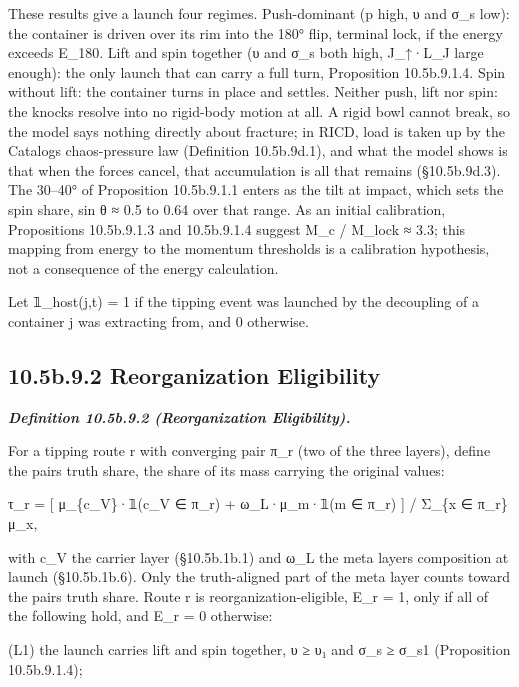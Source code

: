 \documentclass[
]{article}
\begin{document}
These results give a launch four regimes. Push-dominant (p high, υ and
σ\_s low): the container is driven over its rim into the 180° flip,
terminal lock, if the energy exceeds E\_180. Lift and spin together (υ
and σ\_s both high, J\_↑·L\_J large enough): the only launch that can
carry a full turn, Proposition 10.5b.9.1.4. Spin without lift: the
container turns in place and settles. Neither push, lift nor spin: the
knocks resolve into no rigid-body motion at all. A rigid bowl cannot
break, so the model says nothing directly about fracture; in RICD, load
is taken up by the Catalog\textquotesingle s chaos-pressure law
(Definition 10.5b.9d.1), and what the model shows is that when the
forces cancel, that accumulation is all that remains (§10.5b.9d.3). The
30--40° of Proposition 10.5b.9.1.1 enters as the tilt at impact, which
sets the spin share, sin θ ≈ 0.5 to 0.64 over that range. As an initial
calibration, Propositions 10.5b.9.1.3 and 10.5b.9.1.4 suggest M\_c /
M\_lock ≈ 3.3; this mapping from energy to the momentum thresholds is a
calibration hypothesis, not a consequence of the energy calculation.

Let 𝟙\_host(j,t) = 1 if the tipping event was launched by the decoupling
of a container j was extracting from, and 0 otherwise.

\hypertarget{b.9.2-reorganization-eligibility}{%
\subsection{10.5b.9.2 Reorganization
Eligibility}\label{b.9.2-reorganization-eligibility}}

\emph{\textbf{Definition 10.5b.9.2 (Reorganization Eligibility).}}

For a tipping route r with converging pair π\_r (two of the three
layers), define the pair\textquotesingle s truth share, the share of its
mass carrying the original values:

τ\_r = {[} μ\_\{c\_V\}·𝟙(c\_V ∈ π\_r) + ω\_L·μ\_m·𝟙(m ∈ π\_r) {]} /
Σ\_\{x ∈ π\_r\} μ\_x,

with c\_V the carrier layer (§10.5b.1b.1) and ω\_L the meta
layer\textquotesingle s composition at launch (§10.5b.1b.6). Only the
truth-aligned part of the meta layer counts toward the
pair\textquotesingle s truth share. Route r is reorganization-eligible,
E\_r = 1, only if all of the following hold, and E\_r = 0 otherwise:

(L1) the launch carries lift and spin together, υ ≥ υ₁ and σ\_s ≥ σ\_s1
(Proposition 10.5b.9.1.4);
\end{document}
